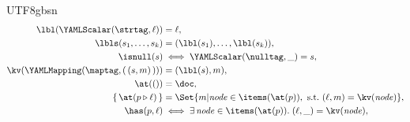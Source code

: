 \begin{CJK*}{UTF8}{gbsn}
\begin{equation}
\begin{aligned}
  \lbl(\YAMLScalar(\strtag, \ell)) &= \ell, \\
  \lbls(s_1, \ldots, s_k) &= (\lbl(s_1), \ldots, \lbl(s_k)), \\
  \isnull(s) &\iff \YAMLScalar(\nulltag, {\_}) = s, \\
  \kv(\YAMLMapping(\maptag, (\, (s, m) \,))) &= (\lbl(s), m), \\
  \at(()) &= \doc, \\
  \{\, \at(p \snoc \ell) \,\} &= \Set{ m | \mathit{node} \in \items(\at(p)),\ \text{s.t.}\ (\ell, m) = \kv(\mathit{node}) }, \\
  \has(p, \ell) &\iff \exists\, \mathit{node} \in \items(\at(p)).\; (\ell, \_) = \kv(\mathit{node}), \\

\end{aligned}
\end{equation}
\end{CJK*}
